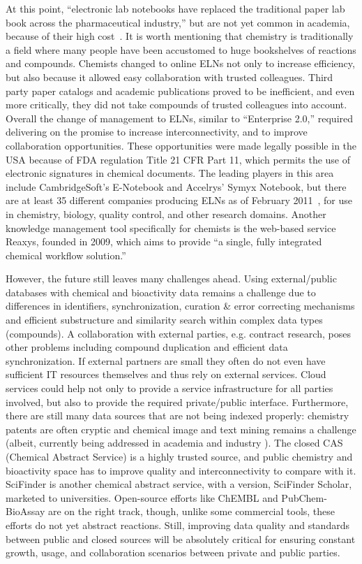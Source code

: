 \documentclass{sig-alternate}
\begin{document}
At this point, ``electronic lab notebooks have replaced the
traditional paper lab book across the pharmaceutical industry,'' but
are not yet common in academia, because of their high
cost~\cite{WavingGoodbye}.  It is worth mentioning that chemistry is
traditionally a field where many people have been accustomed to huge
bookshelves of reactions and compounds. Chemists changed to online
ELNs not only to increase efficiency, but also because it allowed easy
collaboration with trusted colleagues. Third party paper catalogs and
academic publications proved to be inefficient, and even more
critically, they did not take compounds of trusted colleagues into
account. Overall the change of management to ELNs, similar to
``Enterprise 2.0,'' required delivering on the promise to increase
interconnectivity, and to improve collaboration opportunities.  These opportunities were made legally possible in the USA because of FDA regulation Title 21 CFR Part 11, which permits the use of electronic signatures in chemical documents.  The
leading players in this area include CambridgeSoft's E-Notebook and
Accelrys' Symyx Notebook, but there are at least 35 different
companies producing ELNs as of February 2011~\cite{ELNreview}, for use
in chemistry, biology, quality control, and other research domains.  Another
knowledge management tool specifically for chemists is the web-based
service Reaxys, founded in 2009, which aims to provide ``a
single, fully integrated chemical workflow solution.''

However, the future still leaves many challenges ahead. Using
external/public databases with chemical and bioactivity data remains a
challenge due to differences in identifiers, synchronization, curation
\& error correcting mechanisms and efficient substructure and
similarity search within complex data types (compounds). A
collaboration with external parties, e.g. contract research, poses
other problems including compound duplication and efficient data
synchronization. If external partners are small they often do not even
have sufficient IT resources themselves and thus rely on external
services. Cloud services could help not only to provide a service
infrastructure for all parties involved, but also to provide the
required private/public interface. Furthermore, there are still many
data sources that are not being indexed properly: chemistry patents
are often cryptic and chemical image and text mining remains a
challenge (albeit, currently being addressed in academia and industry
\cite{Jessop:2011fk,Sayle:2009uq}). The closed CAS (Chemical Abstract
Service) is a highly trusted source, and public chemistry and
bioactivity space has to improve quality and interconnectivity to
compare with it. SciFinder is another chemical abstract service, with a version, SciFinder Scholar, marketed to universities.  Open-source efforts like ChEMBL and PubChem-BioAssay are on the
right track, though, unlike some commercial tools, these efforts do not yet abstract reactions. Still, improving data quality and standards between
public and closed sources will be absolutely critical for ensuring
constant growth, usage, and collaboration scenarios between private
and public parties.
\end{document}
